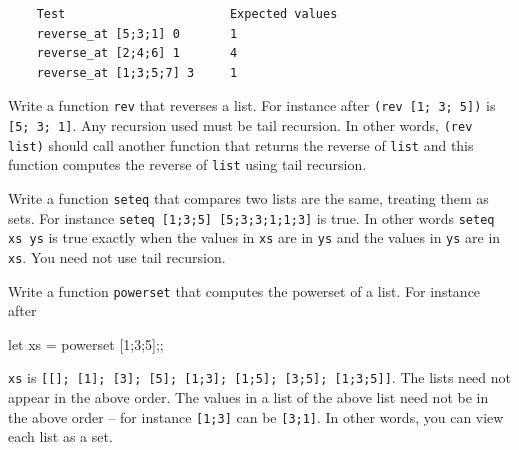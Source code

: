 \begin{Verbatim}
	Test                       Expected values
	reverse_at [5;3;1] 0       1
	reverse_at [2;4;6] 1       4
	reverse_at [1;3;5;7] 3     1
\end{Verbatim}


\ANSWER
\begin{answercode}

\end{answercode}

\newpage
\nextq
Write a function \verb!rev! that reverses a list.
For instance after
\verb!(rev [1; 3; 5])!
is \verb![5; 3; 1]!.
Any recursion used must be tail recursion.
In other words,
\verb!(rev list)!
should call another function that returns the reverse of \verb!list!
and this function computes the reverse of
\verb!list! using tail recursion.

\ANSWER
\begin{answercode}

\end{answercode}

\newpage
\nextq
Write a function \verb!seteq! that compares two lists are the same,
treating them as sets.
For instance
\verb!seteq [1;3;5] [5;3;3;1;1;3]!
is true.
In other words
\verb!seteq xs ys! is true exactly when the values in \verb!xs!
are in \verb!ys! and the values in \verb!ys! are in \verb!xs!.
You need not use tail recursion.
\\
\ANSWER
\begin{answercode}

\end{answercode}

\newpage
\nextq
Write a function \verb!powerset! that computes the powerset
of a list.
For instance after
\begin{console}
let xs = powerset [1;3;5];;
\end{console}
\verb!xs! is \verb![[]; [1]; [3]; [5]; [1;3]; [1;5]; [3;5]; [1;3;5]]!.
The lists need not appear in the above order.
The values in a list of the above list need not be in the above order --
for instance \verb![1;3]! can be \verb![3;1]!.
In other words, you can view each list as a set.

\ANSWER
\begin{answercode}

\end{answercode}


